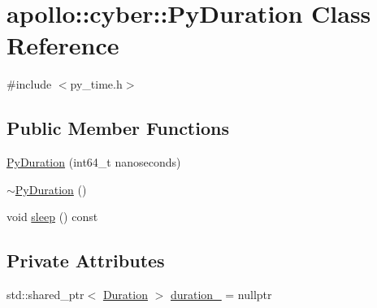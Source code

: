 \hypertarget{classapollo_1_1cyber_1_1PyDuration}{\section{apollo\-:\-:cyber\-:\-:Py\-Duration Class Reference}
\label{classapollo_1_1cyber_1_1PyDuration}
}


{\ttfamily \#include $<$py\-\_\-time.\-h$>$}

\subsection*{Public Member Functions}
\begin{DoxyCompactItemize}
\item 
\hyperlink{classapollo_1_1cyber_1_1PyDuration_a179ebb37f6d71f3437f81a2df438ca78}{Py\-Duration} (int64\-\_\-t nanoseconds)
\item 
\hyperlink{classapollo_1_1cyber_1_1PyDuration_ad033b1b395e27098a4cbaa2166625e80}{$\sim$\-Py\-Duration} ()
\item 
void \hyperlink{classapollo_1_1cyber_1_1PyDuration_a0ed135a2dffc0105af5af12500ff7a1e}{sleep} () const 
\end{DoxyCompactItemize}
\subsection*{Private Attributes}
\begin{DoxyCompactItemize}
\item 
std\-::shared\-\_\-ptr$<$ \hyperlink{classapollo_1_1cyber_1_1Duration}{Duration} $>$ \hyperlink{classapollo_1_1cyber_1_1PyDuration_a842d5b66f4981d02ad53f4e869b4adef}{duration\-\_\-} = nullptr
\end{DoxyCompactItemize}


